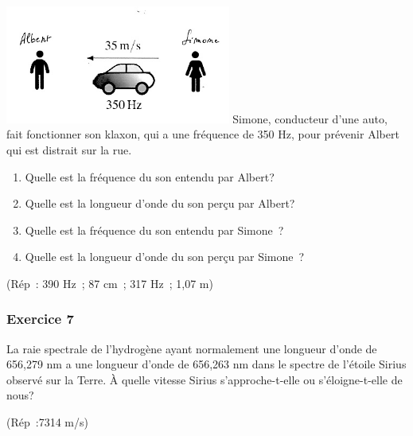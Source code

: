 \includegraphics[width=7.4cm,height=3.882cm]{Pictures/10000001000001A1000000DB0C45621DF12277A1.png}
Simone, conducteur d'une auto, fait fonctionner son klaxon, qui a une fréquence de
350 Hz, pour prévenir Albert qui est distrait sur la rue.
\begin{enumerate}
	\item Quelle est la fréquence du son entendu par Albert?
	\item Quelle est la longueur d'onde du son perçu par Albert?
	\item Quelle est la fréquence du son entendu par Simone~?
	\item Quelle est la longueur d'onde du son perçu par Simone~?
\end{enumerate}

(Rép~: 390 Hz~; 87 cm~; 317 Hz~; 1,07 m)

\subsubsection{Exercice 7}

La raie spectrale de l'hydrogène ayant normalement une longueur d'onde
de 656,279 nm a une longueur d'onde de 656,263 nm dans le spectre de
l'étoile Sirius observé sur la Terre. À quelle vitesse Sirius
s'approche-t-elle ou s'éloigne-t-elle de nous?

(Rép~:7314 m/s)
